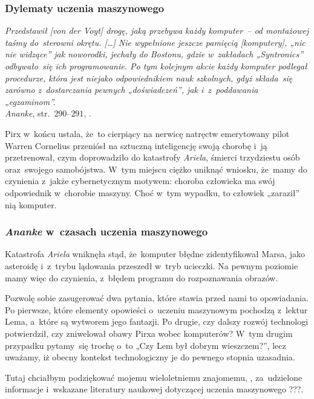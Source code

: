 \documentclass[10pt,t]{beamer}
\begin{document}
\begin{frame}
  \frametitle{Dylematy uczenia maszynowego}


  \textit{Przedstawił [von der Voyt] drogę, jaką przebywa każdy komputer~--
    od montażowej taśmy do~sterowni okrętu. [\ldots] Nie wypełnione jeszcze
    pamięcią [komputery], „nic nie widzące” jak noworodki, jechały do
    Bostonu, gdzie w~zakładach „Syntronics” odbywało~się ich programowanie.
    Po tym kolejnym akcie każdy komputer podlegał procedurze, która jest
    niejako odpowiednikiem nauk szkolnych, gdyż składa~się zarówno
    z~dostarczania pewnych „doświadczeń”, jak i~z~poddawania
    „egzaminom”.} \\
  \textit{Ananke}, str.~$290\text{--}291$,
  \parencite{Lem-Ogrod-ciemnosci-i-inne-opowiadania-Pub-2017}.

  Pirx w~końcu ustala, że~to cierpiący na nerwicę natręctw emerytowany
  pilot Warren Cornelius przeniósł na sztuczną inteligencję swoją chorobę
  i~ją przetrenował, czym doprowadziło do katastrofy \textit{Ariela},
  śmierci trzydziestu osób oraz~swojego samobójstwa. W~tym miejscu
  ciężko uniknąć wniosku, że~mamy do czynienia z~jakże cybernetycznym
  motywem: choroba człowieka ma swój odpowiednik w~chorobie maszyny.
  Choć w~tym wypadku, to człowiek „zaraził” nią komputer.

\end{frame}





\begin{frame}
  \frametitle{\textit{Ananke} w~czasach uczenia maszynowego}


  Katastrofa \textit{Ariela} wniknęła stąd, że~komputer błędne
  zidentyfikował Marsa, jako asteroidę i~z~trybu lądowania przeszedł
  w~tryb ucieczki. Na pewnym poziomie mamy więc do czynienia, z~błędem
  programu do rozpoznawania obrazów.

  Pozwolę sobie zasugerować dwa pytania, które stawia przed nami to
  opowiadania. Po pierwsze, które elementy opowieści o~uczeniu maszynowym
  pochodzą z~lektur Lema, a~które są wytworem jego fantazji. Po drugie,
  czy dalszy rozwój technologi potwierdził, czy zniwelował obawy Pirxa
  wobec komputerów? W~tym drugim przypadku pytamy~się trochę o~to „Czy
  Lem był dobrym wieszczem?”, lecz uważamy, iż obecny kontekst
  technologiczny je do pewnego stopnia uzasadnia.

  Tutaj chciałbym podziękować mojemu wieloletniemu znajomemu,
  ,
  za~udzielone informacje i~wskazane literatury naukowej dotyczącej
  uczenia maszynowego ???.

\end{frame}
\end{document}
